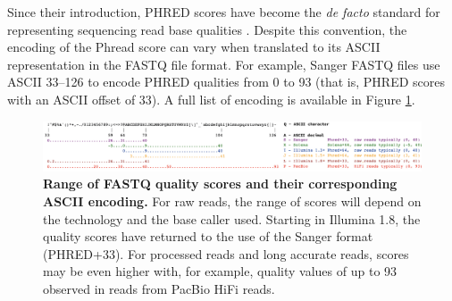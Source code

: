\begin{table}[h!]
\caption{\textbf{PHRED quality scores are logarithmically linked to error probabilities.} A PHRED Score of 20 indicates the likelihood of finding 1 incorrect base call among 100 bases. In other words, the precision of the base call is 99\%. $\mathbf{Q}$ scores are classified as a property that is associated logarithmically with the probabilities of base calling error $\mathbf{P}$.} \label{tab:phred_error}
\end{table}

Since their introduction, PHRED scores have become the \textit{de facto} standard for representing sequencing read base qualities \citep{cock_sanger_2010}. Despite this convention, the encoding of the Phread score can vary when translated to its ASCII representation in the FASTQ file format. For example, Sanger FASTQ files use ASCII 33–126 to encode PHRED qualities from 0 to 93 (that is, PHRED scores with an ASCII offset of 33). A full list of encoding is available in Figure \ref{fig:figure6}. 

\begin{figure}[h!]
\centering
\includegraphics[width=\textwidth]{figures/introduction/Figure 6.png}
\caption{\textbf{Range of FASTQ quality scores and their corresponding ASCII encoding.} For raw reads, the range of scores will depend on the technology and the base caller used. Starting in Illumina 1.8, the quality scores have returned to the use of the Sanger format (PHRED+33). For processed reads and long accurate reads, scores may be even higher with, for example, quality values of up to 93 observed in reads from PacBio HiFi reads.}
\label{fig:figure6}
\end{figure}

